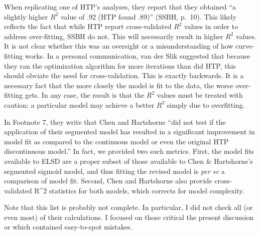 \begin{appendix}
When replicating one of HTP's analyses, they report that they obtained
``a slightly higher \(R^2\) value of .92 (HTP found .89)'' (SSBH,
p.~10). This likely reflects the fact that while HTP report
cross-validated \(R^2\) values in order to address over-fitting, SSBH do
not. This will necessarily result in higher \(R^2\) values. It is not
clear whether this was an oversight or a misunderstanding of how
curve-fitting works. In a personal communication, van der Slik suggested
that because they ran the optimization algorithm for more iterations
than did HTP, this should obviate the need for cross-validation. This is
exactly backwards. It is a necessary fact that the more closely the
model is fit to the data, the worse over-fitting gets. In any case, the
result is that the \(R^2\) values must be treated with caution: a
particular model may achieve a better \(R^2\) simply due to overfitting.

In Footnote 7, they write that Chen and Hartshorne ``did not test if the
application of their segmented model has resulted in a significant
improvement in model fit as compared to the continuous model or even the
original HTP discontinuous model.'' In fact, we provided two such
metrics. First, the model fits available to ELSD are a proper subset of
those available to Chen \& Hartshorne's segmented sigmoid model, and
thus fitting the revised model is \emph{per se} a comparison of model
fit. Second, Chen and Hartshorne also provide cross-validated R\^{}2
statistics for both models, which corrects for model complexity.

Note that this list is probably not complete. In particular, I did not
check all (or even most) of their calculations. I focused on those
critical the present discussion or which contained easy-to-spot
mistakes.
\end{appendix}
